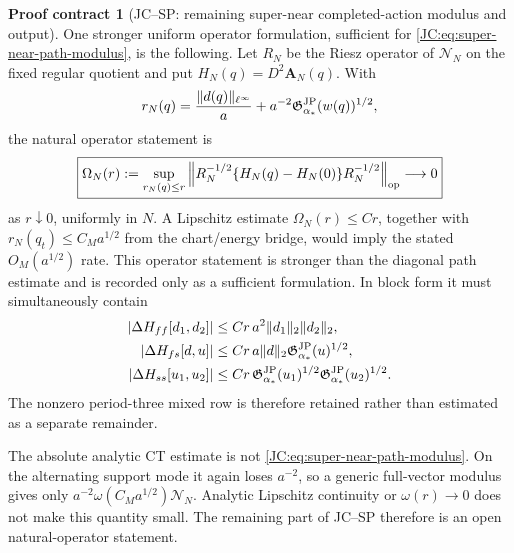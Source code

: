 \documentclass[11pt]{amsart}
\numberwithin{equation}{section}
\theoremstyle{definition}
\newtheorem{contract}[theorem]{Proof contract}
\theoremstyle{remark}
\newcommand{\Gjp}{\mathfrak G^{\rm JP}}
\begin{document}
\begin{contract}[JC--SP: remaining super-near completed-action modulus and output]
One stronger uniform operator formulation, sufficient for
\eqref{JC:eq:super-near-path-modulus}, is the following.  Let $R_N$ be the Riesz operator of
$\mathcal N_N$ on the fixed regular quotient and put
$H_N(q)=D^2\mathbf A_N(q)$.  With
\[
 r_N(q)=\frac{\|d(q)\|_{\ell^\infty}}a
 +a^{-2}\Gjp_{\alpha_*}(w(q))^{1/2},
\]
the natural operator statement is
\begin{equation}\label{JC:eq:super-near-operator-modulus}
 \boxed{
 \Omega_N(r):=
 \sup_{r_N(q)\le r}
 \left\|R_N^{-1/2}
 \{H_N(q)-H_N(0)\}R_N^{-1/2}\right\|_{\rm op}
 \longrightarrow0}
\end{equation}
as $r\downarrow0$, uniformly in $N$.  A Lipschitz estimate
$\Omega_N(r)\le Cr$, together with
$r_N(q_t)\le C_Ma^{1/2}$ from the chart/energy bridge, would imply the
stated $O_M(a^{1/2})$ rate.  This operator statement is stronger than the
diagonal path estimate and is recorded only as a sufficient formulation.
In block
form it must simultaneously contain
\begin{align*}
 |\Delta H_{ff}[d_1,d_2]|
 &\le Cr\,a^2\|d_1\|_2\|d_2\|_2,\\
 |\Delta H_{fs}[d,u]|
 &\le Cr\,a\|d\|_2\Gjp_{\alpha_*}(u)^{1/2},\\
 |\Delta H_{ss}[u_1,u_2]|
 &\le Cr\,
 \Gjp_{\alpha_*}(u_1)^{1/2}
 \Gjp_{\alpha_*}(u_2)^{1/2}.
\end{align*}
The nonzero period-three mixed row is therefore retained rather than
estimated as a separate remainder.

The absolute analytic CT estimate is not
\eqref{JC:eq:super-near-path-modulus}.  On the alternating support mode it
again loses $a^{-2}$, so a generic full-vector modulus gives only
$a^{-2}\omega(C_Ma^{1/2})\mathcal N_N$.  Analytic Lipschitz continuity or
$\omega(r)\to0$ does not make this quantity small.  The remaining part of
JC--SP therefore is an open natural-operator statement.


\end{contract}
\end{document}
